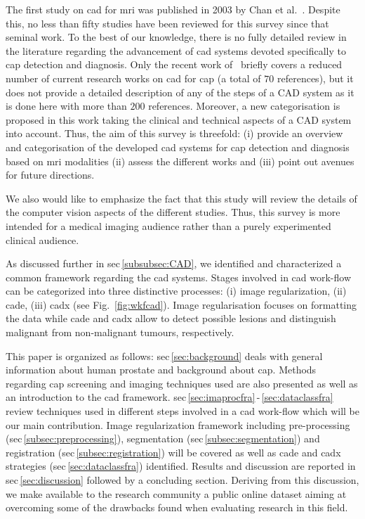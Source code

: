 The first study on \acs{cad} for \ac{mri} was published in 2003 by Chan et al.~\cite{Chan2003}. Despite this, no less than fifty studies have been reviewed for this survey since that seminal work. To the best of our knowledge, there is no fully detailed review in the literature regarding the advancement of \acs{cad} systems devoted specifically to \ac{cap} detection and diagnosis. Only the recent work of~\cite{Wang2014} briefly covers a reduced number of current research works on \acs{cad} for \ac{cap} (a total of $70$ references), but it does not provide a detailed description of any of the steps of a CAD system as it is done here with more than $200$ references. Moreover, a new categorisation is proposed in this work taking the clinical and technical aspects of a CAD system into account. Thus, the aim of this survey is threefold: (i) provide an overview and categorisation of the developed \acs{cad} systems for \ac{cap} detection and diagnosis based on \ac{mri} modalities (ii) assess the different works and (iii) point out avenues for future directions.

We also would like to emphasize the fact that this study will review the details of the computer vision aspects of the different studies. Thus, this survey is more intended for a medical imaging audience rather than a purely experimented clinical audience.

As discussed further in \acs{sec}\,\ref{subsubsec:CAD}, we identified and characterized a common framework regarding the \acs{cad} systems. Stages involved in \acs{cad} work-flow can be categorized into three distinctive processes: (i) image regularization, (ii) \ac{cade}, (iii) \ac{cadx} (see Fig.~\ref{fig:wkfcad}). Image regularisation focuses on formatting the data while \ac{cade} and \ac{cadx} allow to detect possible lesions and distinguish malignant from non-malignant tumours, respectively.

This paper is organized as follows: \acs{sec}\,\ref{sec:background} deals with general information about human prostate and background about \ac{cap}. Methods regarding \ac{cap} screening and imaging techniques used are also presented as well as an introduction to the \acs{cad} framework. \acs{sec}\,\ref{sec:imaprocfra}\,-\,\ref{sec:dataclassfra} review techniques used in different steps involved in a \acs{cad} work-flow which will be our main contribution. Image regularization framework including pre-processing (\acs{sec}\,\ref{subsec:preprocessing}), segmentation (\acs{sec}\,\ref{subsec:segmentation}) and registration (\acs{sec}\,\ref{subsec:registration}) will be covered as well as \ac{cade} and \ac{cadx} strategies (\acs{sec}\,\ref{sec:dataclassfra}) identified. Results and discussion are reported in \acs{sec}\,\ref{sec:discussion} followed by a concluding section. Deriving from this discussion, we make available to the research community a public online dataset aiming at overcoming some of the drawbacks found when evaluating research in this field.

